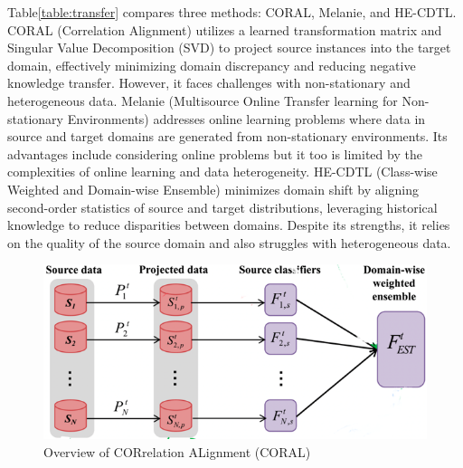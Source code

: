 Table\ref{table:transfer} compares three methods: CORAL, Melanie, and HE-CDTL. CORAL (Correlation Alignment) utilizes a learned transformation matrix and Singular Value Decomposition (SVD) to project source instances into the target domain, effectively minimizing domain discrepancy and reducing negative knowledge transfer. However, it faces challenges with non-stationary and heterogeneous data. Melanie (Multisource Online Transfer learning for Non-stationary Environments) addresses online learning problems where data in source and target domains are generated from non-stationary environments. Its advantages include considering online problems but it too is limited by the complexities of online learning and data heterogeneity. HE-CDTL (Class-wise Weighted and Domain-wise Ensemble) minimizes domain shift by aligning second-order statistics of source and target distributions, leveraging historical knowledge to reduce disparities between domains. Despite its strengths, it relies on the quality of the source domain and also struggles with heterogeneous data.
\begin{figure}[!ht]

    \begin{center}
        \includegraphics[width=.85\textwidth]{3_State-of-the-art/fig/coral.png} 
    \end{center}
    \caption{Overview of CORrelation ALignment (CORAL)}
    \label{coral_fig}
    \end{figure}

